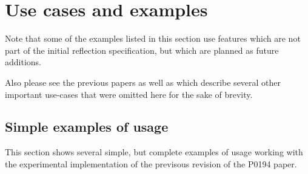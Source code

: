\section{Use cases and examples}
\label{use-cases-examples}

Note that some of the examples listed in this section use features which
are not part of the initial reflection specification, but which are planned
as future additions.

Also please see the previous papers \cite{Chochlik-N4452,Chochlik-P0385R1}
as well as \cite{Chochlik-CAI} which describe several other important use-cases
that were omitted here for the sake of brevity.







%

\subsection{Simple examples of usage}
\label{working-examples}

This section shows several simple, but complete examples of usage working
with the experimental implementation of the previsous revision of the P0194
paper.









